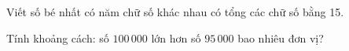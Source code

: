 \begin{ex} %
Viết số bé nhất có năm chữ số khác nhau có tổng các chữ số bằng 15.
\end{ex}

\begin{ex} %
Tính khoảng cách: số $100\,000$ lớn hơn số $95\,000$ bao nhiêu đơn vị?
\end{ex}
